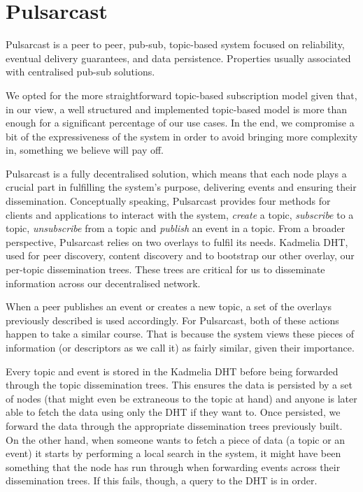 
\section{Pulsarcast}
\label{section:pulsarcast}

Pulsarcast is a peer to peer, pub-sub, topic-based system focused on
reliability, eventual delivery guarantees, and data persistence. Properties
usually associated with centralised pub-sub solutions. 

We opted for the more straightforward topic-based subscription model given
that, in our view, a well structured and implemented topic-based model is more
than enough for a significant percentage of our use cases. In the end, we
compromise a bit of the expressiveness of the system in order to avoid bringing
more complexity in, something we believe will pay off.

Pulsarcast is a fully decentralised solution, which means that each node plays
a crucial part in fulfilling the system's purpose, delivering events and
ensuring their dissemination. Conceptually speaking, Pulsarcast provides four
methods for clients and applications to interact with the system, \emph{create}
a topic, \emph{subscribe} to a topic, \emph{unsubscribe} from a topic and
\emph{publish} an event in a topic. From a broader perspective, Pulsarcast
relies on two overlays to fulfil its needs. Kadmelia DHT, used for peer
discovery, content discovery and to bootstrap our other overlay, our per-topic
dissemination trees. These trees are critical for us to disseminate information
across our decentralised network.

When a peer publishes an event or creates a new topic, a set of the overlays
previously described is used accordingly. For Pulsarcast, both of these
actions happen to take a similar course. That is because the system views
these pieces of information (or descriptors as we call it) as fairly similar,
given their importance.

Every topic and event is stored in the Kadmelia DHT before being forwarded
through the topic dissemination trees. This ensures the data is persisted by a
set of nodes (that might even be extraneous to the topic at hand) and anyone is
later able to fetch the data using only the DHT if they want to. Once
persisted, we forward the data through the appropriate dissemination trees
previously built. On the other hand, when someone wants to fetch a piece of
data (a topic or an event) it starts by performing a local search in the
system, it might have been something that the node has run through when
forwarding events across their dissemination trees. If this fails, though, a
query to the DHT is in order.

